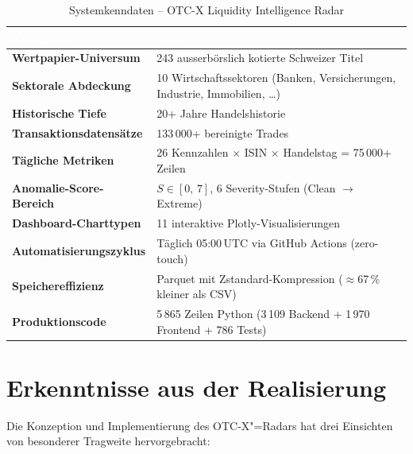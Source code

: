 \documentclass[11pt, a4paper, oneside, openany]{report}
\begin{document}
\begin{table}[H]
\centering
\caption{Systemkenndaten -- OTC-X Liquidity Intelligence Radar}
\label{tab:kenndaten}
\sffamily\small
{}
\begin{tabularx}{\textwidth}{>{\bfseries}l X}
  \toprule
  \rowcolor{DeepNavy} \textcolor{white}{\textbf{Kenngrösse}} & \textcolor{white}{\textbf{Wert}} \\
  \midrule
  Wertpapier-Universum        & 243 ausserbörslich kotierte Schweizer Titel \\
  Sektorale Abdeckung         & 10 Wirtschaftssektoren (Banken, Versicherungen, Industrie, Immobilien, \ldots) \\
  Historische Tiefe            & 20+ Jahre Handelshistorie \\
  Transaktionsdatensätze       & 133\,000+ bereinigte Trades \\
  Tägliche Metriken            & 26 Kennzahlen $\times$ ISIN $\times$ Handelstag = 75\,000+ Zeilen \\
  Anomalie-Score-Bereich       & $S \in [0,\,7]$, 6 Severity-Stufen (Clean $\to$ Extreme) \\
  Dashboard-Charttypen         & 11 interaktive Plotly-Visualisierungen \\
  Automatisierungszyklus       & Täglich 05:00\,UTC via GitHub Actions (zero-touch) \\
  Speichereffizienz            & Parquet mit Zstandard-Kompression ($\approx$67\,\% kleiner als CSV) \\
  Produktionscode              & 5\,865 Zeilen Python (3\,109 Backend + 1\,970 Frontend + 786 Tests) \\
  \bottomrule
\end{tabularx}
\end{table}

\section{Erkenntnisse aus der Realisierung}

Die Konzeption und Implementierung des OTC-X"=Radars hat drei Einsichten von besonderer Tragweite hervorgebracht:
\end{document}
